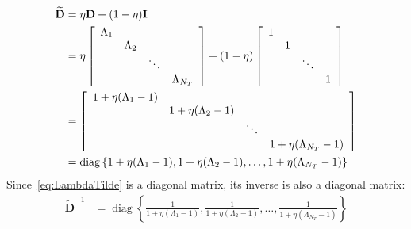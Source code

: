 \documentclass[12pt,letter]{article}\usepackage[]{graphicx}\usepackage[]{color}
\newcommand{\bD}{\textbf{D}}
\newcommand{\bI}{\textbf{I}}
\DeclareMathOperator{\diag}{diag} %
\begin{document}
\begin{align}
	\widetilde{\bD} & = \eta  \bD + (1-\eta) \bI  \label{eq:LambdaTilde} \\
	& =  \eta \left[ \begin{array}{cccc}
		\Lambda_1 & \hfill & \hfill & \hfill  \\
		\hfill & \Lambda_2 & \hfill & \hfill  \\
		\hfill & \hfill & \ddots &\hfill  \\
		\hfill & \hfill & \hfill & \Lambda_{N_T}  \\
	\end{array} \right] + (1-\eta) \left[ \begin{array}{cccc}
	1 & \hfill & \hfill & \hfill  \\
	\hfill & 1 & \hfill & \hfill  \\
	\hfill & \hfill & \ddots &\hfill  \\
	\hfill & \hfill & \hfill & 1  \\
\end{array} \right]  \nonumber \\
& =   \left[ \begin{array}{cccc}
	1 + \eta (\Lambda_1-1) & \hfill & \hfill & \hfill  \\
	\hfill & 1 + \eta (\Lambda_2-1) & \hfill & \hfill  \\
	\hfill & \hfill & \ddots &\hfill  \\
	\hfill & \hfill & \hfill & 1 + \eta (\Lambda_{N_T}-1)  \\
\end{array} \right]   \nonumber \\
& = \diag\left\lbrace 1 + \eta (\Lambda_1-1), 1 + \eta (\Lambda_2-1), \ldots, 1 + \eta (\Lambda_{N_T}-1) \label{eq:DiagLambda} \right\rbrace
\end{align}
Since~\eqref{eq:LambdaTilde} is a diagonal matrix, its inverse is also a diagonal matrix:
\begin{align}
	\widetilde{\bD}^{-1} & = \diag\left\lbrace \frac{1}{1 + \eta (\Lambda_1-1)}, \frac{1}{1 + \eta (\Lambda_2-1)}, \ldots, \frac{1}{1 + \eta (\Lambda_{N_T}-1)} \label{eq:DiagInvLambda} \right\rbrace
\end{align}
\end{document}
